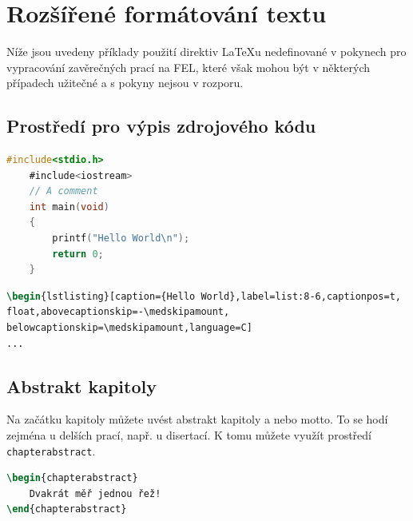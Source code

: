\clearpage

\section{Rozšířené formátování textu}

Níže jsou uvedeny příklady použití direktiv \LaTeX{}u nedefinované v pokynech pro vypracování zavěrečných prací na FEL, které však mohou být v některých případech užitečné a s pokyny nejsou v rozporu. 

\subsection{Prostředí pro výpis zdrojového kódu}

\begin{lstlisting}[caption={Výpis zdrojového kódu v jazyce C},label=list:8-6,captionpos=t,abovecaptionskip=-\medskipamount,belowcaptionskip=\medskipamount,language=C]
    #include<stdio.h>
    #include<iostream>
    // A comment
    int main(void)
    {
        printf("Hello World\n");
        return 0;
    }
\end{lstlisting}

\begin{lstlisting}[caption={Příklad vložení výpisu zdrojového kódu},label=list:8-6,captionpos=t,abovecaptionskip=-\medskipamount,belowcaptionskip=\medskipamount,language=TeX]
\begin{lstlisting}[caption={Hello World},label=list:8-6,captionpos=t,
float,abovecaptionskip=-\medskipamount,
belowcaptionskip=\medskipamount,language=C]
...
\end{lstlisting}

\subsection{Abstrakt kapitoly}

Na začátku kapitoly můžete uvést abstrakt kapitoly a nebo motto. To se hodí zejména u delších prací, např. u disertací. K tomu můžete využít prostředí \texttt{chapterabstract}.

\begin{lstlisting}[caption={Příklad vložení motta kapitoly},label=list:8-6,captionpos=t,abovecaptionskip=-\medskipamount,belowcaptionskip=\medskipamount,language=TeX]
\begin{chapterabstract}
    Dvakrát měř jednou řež!
\end{chapterabstract}
\end{lstlisting}

